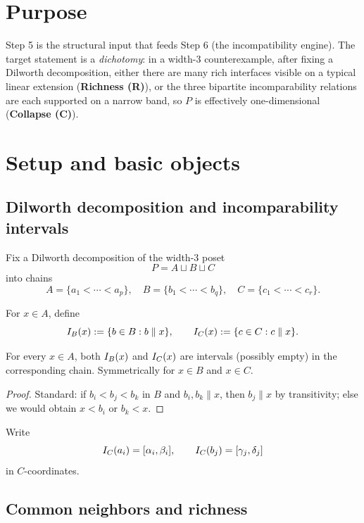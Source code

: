 
\section*{Purpose}

Step 5 is the structural input that feeds Step 6 (the incompatibility engine).
The target statement is a \emph{dichotomy}: in a width-3 counterexample, after fixing
a Dilworth decomposition, either there are many rich interfaces visible on a typical
linear extension (\textbf{Richness (R)}), or the three bipartite incomparability
relations are each supported on a narrow band, so $P$ is effectively one-dimensional
(\textbf{Collapse (C)}).

\section{Setup and basic objects}

\subsection{Dilworth decomposition and incomparability intervals}

Fix a Dilworth decomposition of the width-3 poset
\[
P = A \sqcup B \sqcup C
\]
into chains
\[
A = \{a_1 < \cdots < a_p\},\quad
B = \{b_1 < \cdots < b_q\},\quad
C = \{c_1 < \cdots < c_r\}.
\]

For $x \in A$, define
\[
I_B(x) := \{b \in B : b \parallel x\},\qquad
I_C(x) := \{c \in C : c \parallel x\}.
\]

\begin{lemma}\label{lem:interval-form}
For every $x \in A$, both $I_B(x)$ and $I_C(x)$ are intervals (possibly empty) in
the corresponding chain. Symmetrically for $x \in B$ and $x \in C$.
\end{lemma}

\begin{proof}
Standard: if $b_i < b_j < b_k$ in $B$ and $b_i, b_k \parallel x$, then $b_j \parallel x$
by transitivity; else we would obtain $x < b_i$ or $b_k < x$.
\end{proof}

Write
\[
I_C(a_i) = [\alpha_i, \beta_i],\qquad
I_C(b_j) = [\gamma_j, \delta_j]
\]
in $C$-coordinates.

\subsection{Common neighbors and richness}

